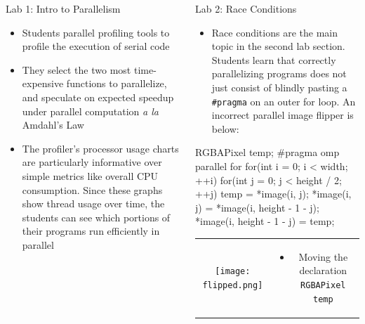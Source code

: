 \documentclass[final,t]{beamer}
\begin{document}
\begin{frame}[fragile]{}
\begin{columns}[t]
\begin{column}{.3\linewidth}
\begin{block}{Lab 1: Intro to Parallelism}
                \begin{itemize}
                    \item Students parallel profiling tools to profile the
                        execution of serial code
                    \item They  select the two most time-expensive functions to
                        parallelize, and speculate on expected speedup under
                        parallel computation \emph{a la} Amdahl's Law
                    \item The profiler's processor usage charts are particularly
                        informative over simple metrics like overall CPU
                        consumption. Since these graphs show thread usage over
                        time, the students can see which portions of their
                        programs run efficiently in parallel
                \end{itemize}
                \vspace*{1.2in}
            \end{block}
        \end{column}
        \begin{column}{.3\linewidth}
            \begin{block}{Lab 2: Race Conditions}
                \begin{itemize}
                    \item Race conditions are the main topic in the second lab
                        section. Students learn that correctly parallelizing
                        programs does not just consist of blindly pasting a
                        \verb|#pragma| on an outer for loop. An incorrect
                        parallel image flipper is below:
                \end{itemize}
                \begin{cppcode}
RGBAPixel temp;
#pragma omp parallel for
for(int i = 0; i < width; ++i) {
   for(int j = 0; j < height / 2; ++j) {
      temp = *image(i, j);
      *image(i, j) = *image(i, height - 1 - j);
      *image(i, height - 1 - j) = temp;
   }
}
                \end{cppcode}
                \begin{tabular}{cc}
                    \texttt{[image: flipped.png]}
                &
                \begin{minipage}[b]{.5\textwidth}
                    \begin{itemize}
                        \item Moving the declaration \verb|RGBAPixel temp|

\end{itemize}
\end{minipage}
\end{tabular}
\end{block}
\end{column}
\end{columns}
\end{frame}
\end{document}
